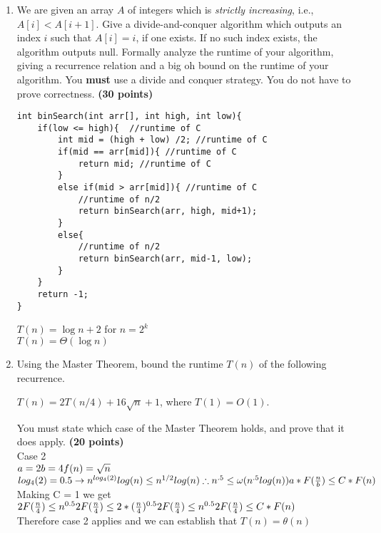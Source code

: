 \documentclass[11pt]{amsart}
\begin{document}
\begin{enumerate}
\item We are given an array $A$ of integers which is \textit{strictly increasing}, i.e., $A[i] < A[i+1]$. Give a divide-and-conquer algorithm which outputs an index $i$ such that $A[i] = i$, if one exists. If no such index exists, the algorithm outputs null. Formally analyze the runtime of your algorithm, giving a recurrence relation and a big oh bound on the runtime of your algorithm. You \textbf{must} use a divide and conquer strategy. You do not have to prove correctness. \textbf{(30 points)}

\begin{lstlisting}
int binSearch(int arr[], int high, int low){
	if(low <= high){  //runtime of C
		int mid = (high + low) /2; //runtime of C
		if(mid == arr[mid]){ //runtime of C
			return mid; //runtime of C
		}
		else if(mid > arr[mid]){ //runtime of C
			//runtime of n/2
			return binSearch(arr, high, mid+1); 
		}
		else{
			//runtime of n/2
			return binSearch(arr, mid-1, low); 
		}
	}
	return -1;
}
\end{lstlisting}
$T(n) = \log n + 2$ for $n=2^k$\\
$T(n) = \Theta(\log n)$ 
\bigskip

\item Using the Master Theorem, bound the runtime $T(n)$ of the following recurrence. 
\begin{center}
$T(n) = 2T(n/4) + 16\sqrt{n} + 1$, where $T(1) = O(1)$.
\end{center}
You must state which case of the Master Theorem holds, and prove that it does apply. \textbf{(20 points)}
\\Case 2\\
$a = 2\\b = 4\\f(n) = \sqrt{n}$ \hspace{10pt}  $log_4(2)=0.5 \rightarrow n^{log_4(2)}log(n)\leq n^{1/2}log(n)\\ \therefore n^{.5} \leq \omega (n^{.5}log(n))\\a*F(\frac{n}{b})\leq C*F(n)$ \hspace{3pt} Making C = 1 we get \\ $2F(\frac{n}{4})\leq n^{0.5}\\ 2F(\frac{n}{4})\leq 2 * (\frac{n}{4})^{0.5}\\ 2F(\frac{n}{4})\leq n^{0.5}\\2F(\frac{n}{4})\leq C*F(n)$\\Therefore case 2 applies and we can establish that $T(n) = \theta(n)$
\bigskip


\end{enumerate}
\end{document}
